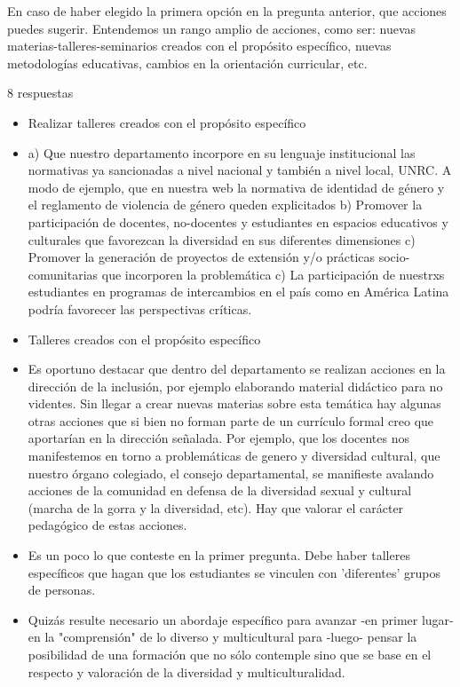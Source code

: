 \documentclass[a4paper,10pt,BCOR10mm,oneside,headsepline]{scrbook}
\begin{document}
\begin{subappendices}
 
 En caso de haber elegido la primera opción en la pregunta anterior, que acciones puedes sugerir. Entendemos un rango amplio de acciones, como ser: nuevas materias-talleres-seminarios creados con el propósito específico, nuevas metodologías educativas, cambios en la orientación curricular, etc. 
 
 8 respuestas

 \begin{itemize}
\item  Realizar talleres creados con el propósito específico

\item a) Que nuestro departamento incorpore en su lenguaje institucional las normativas ya sancionadas a nivel nacional y también a nivel local, UNRC. A modo de ejemplo, que en nuestra web la normativa de identidad de género y el reglamento de violencia de género queden explicitados b) Promover la participación de docentes, no-docentes y estudiantes en espacios educativos y culturales que favorezcan la diversidad en sus diferentes dimensiones c) Promover la generación de proyectos de extensión y/o prácticas socio-comunitarias que incorporen la problemática  c) La participación de nuestrxs estudiantes en programas de intercambios en el país como en América Latina podría favorecer las perspectivas críticas.

\item Talleres creados con el propósito específico

\item Es oportuno destacar que dentro del departamento se realizan acciones en la dirección de la inclusión, por ejemplo elaborando material didáctico para no videntes.  Sin llegar a crear nuevas materias sobre esta temática hay algunas otras acciones que si bien no forman parte de un currículo formal creo que aportarían en la dirección señalada. Por ejemplo, que los docentes nos manifestemos en torno a problemáticas de genero y diversidad cultural, que nuestro órgano colegiado, el consejo departamental, se manifieste avalando acciones de la comunidad en defensa de la diversidad sexual y cultural (marcha de la gorra y la diversidad, etc). Hay que valorar el carácter pedagógico de estas acciones. 

\item Es un poco lo que conteste en la primer pregunta. Debe haber talleres específicos  que hagan que los estudiantes se vinculen con 'diferentes'  grupos de personas.

\item Quizás resulte necesario un abordaje específico para avanzar -en primer lugar- en la "comprensión" de lo diverso y multicultural para -luego- pensar la posibilidad de una formación que no sólo contemple sino que se base en el respecto y valoración de la diversidad y multiculturalidad.


\end{itemize}
\end{subappendices}
\end{document}

